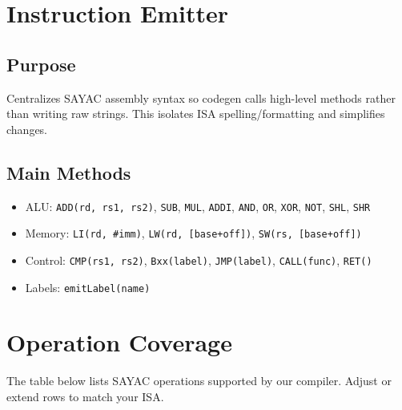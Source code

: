 \documentclass[12pt,a4paper]{report}
\begin{document}
\section{Instruction Emitter}
\subsection{Purpose}
Centralizes SAYAC assembly syntax so codegen calls high-level methods rather than writing raw strings. This isolates ISA spelling/formatting and simplifies changes.

\subsection{Main Methods}
\begin{itemize}
    \item ALU: \texttt{ADD(rd, rs1, rs2)}, \texttt{SUB}, \texttt{MUL}, \texttt{ADDI}, \texttt{AND}, \texttt{OR}, \texttt{XOR}, \texttt{NOT}, \texttt{SHL}, \texttt{SHR}
    \item Memory: \texttt{LI(rd, \#imm)}, \texttt{LW(rd, [base+off])}, \texttt{SW(rs, [base+off])}
    \item Control: \texttt{CMP(rs1, rs2)}, \texttt{Bxx(label)}, \texttt{JMP(label)}, \texttt{CALL(func)}, \texttt{RET()}
    \item Labels: \texttt{emitLabel(name)}
\end{itemize}

\section{Operation Coverage}
The table below lists SAYAC operations supported by our compiler. Adjust or extend rows to match your ISA.
\end{document}
